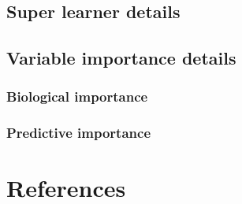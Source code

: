 \documentclass[]{article}
\begin{document}
\hypertarget{sec:sldetails}{%
\subsection{Super learner details}\label{sec:sldetails}}

\hypertarget{variable-importance-details}{%
\subsection{Variable importance details}\label{variable-importance-details}}

\hypertarget{sec:biolimp}{%
\subsubsection{Biological importance}\label{sec:biolimp}}

\hypertarget{predictive-importance}{%
\subsubsection{Predictive importance}\label{predictive-importance}}

\hypertarget{sec:refs}{%
\section{References}\label{sec:refs}}


\end{document}
